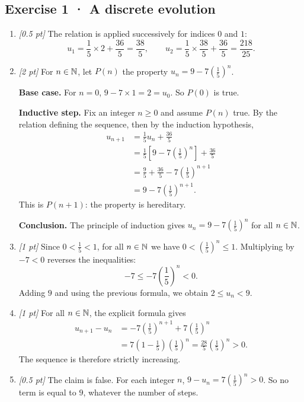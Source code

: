 \subsection*{Exercise 1 · A discrete evolution}\begin{enumerate}

\item \textit{[0.5 pt]} The relation is applied successively for indices $0$ and $1$:\[u_1=\frac{1}{5}\times 2+\frac{36}{5}=\frac{38}{5},\qquad u_2=\frac{1}{5}\times \frac{38}{5}+\frac{36}{5}=\frac{218}{25}.\]

\item \textit{[2 pt]} For $n\in\mathbb N$, let $P(n)$ the property $u_n=9-7\left(\frac{1}{5}\right)^n$.
\par\smallskip\textbf{Base case.} For $n=0$, $9-7\times1=2=u_0$. So $P(0)$ is true.
\par\smallskip\textbf{Inductive step.} Fix an integer $n\ge0$ and assume $P(n)$ true. By the relation defining the sequence, then by the induction hypothesis,
\[\begin{aligned}u_{n+1}&=\frac{1}{5}u_n+\frac{36}{5}\\
&=\frac{1}{5}\left[9-7\left(\frac{1}{5}\right)^n\right]+\frac{36}{5}\\
&=\frac{9}{5}+\frac{36}{5}-7\left(\frac{1}{5}\right)^{n+1}\\
&=9-7\left(\frac{1}{5}\right)^{n+1}.
\end{aligned}\]
This is $P(n+1)$: the property is hereditary.
\par\smallskip\textbf{Conclusion.} The principle of induction gives $u_n=9-7\left(\frac{1}{5}\right)^n$ for all $n\in\mathbb N$.

\item \textit{[1 pt]} Since $0<\frac{1}{5}<1$, for all $n\in\mathbb N$ we have $0<(\frac{1}{5})^n\le1$. Multiplying by $-7<0$ reverses the inequalities:
\[-7\le-7(\frac{1}{5})^n<0.\]
Adding $9$ and using the previous formula, we obtain $2\le u_n<9$.

\item \textit{[1 pt]} For all $n\in\mathbb N$, the explicit formula gives
\[\begin{aligned}u_{n+1}-u_n&=-7(\frac{1}{5})^{n+1}+7(\frac{1}{5})^n\\&=7(1-\frac{1}{5})(\frac{1}{5})^n=\frac{28}{5}(\frac{1}{5})^n>0.\end{aligned}\]
The sequence is therefore strictly increasing.

\item \textit{[0.5 pt]} The claim is false. For each integer $n$, $9-u_n=7(\frac{1}{5})^n>0$. So no term is equal to $9$, whatever the number of steps.

\end{enumerate}


